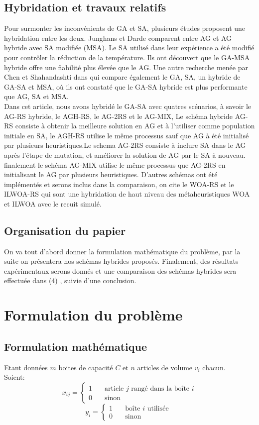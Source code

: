 \documentclass[preprint]{elsarticle}
\begin{document}
\subsection{Hybridation et travaux relatifs}
Pour surmonter les inconvénients  de GA et SA, plusieurs études proposent une hybridation entre les deux.
Junghans et Darde \cite{Junghans} comparent entre AG et AG hybride avec SA modifiée (MSA).
 Le SA utilisé dans leur expérience a été modifié pour contrôler la réduction de la température.
 Ils ont découvert que le GA-MSA hybride offre une fiabilité plus élevée que le AG.
 Une autre recherche menée par Chen et Shahandashti dans \cite{Chen} qui compare également le GA, SA, un hybride de GA-SA et MSA, où ils ont constaté que le GA-SA hybride est plus performante que AG, SA et MSA. \\
Dans cet article, nous avons hybridé le GA-SA avec quatres scénarios, à savoir le AG-RS hybride, le AGH-RS, le AG-2RS et le AG-MIX, Le schéma hybride AG-RS consiste à obtenir la meilleure solution en AG et à l'utiliser comme population initiale en SA,
le AGH-RS utilise le même processus sauf que AG à été initialisé par plusieurs heuristiques.Le schema AG-2RS  consiste à inclure SA dans le AG après l’étape de mutation, et améliorer la solution de AG par le SA à nouveau. finalement le schéma AG-MIX utilise le même processus que AG-2RS en initialisant le AG par plusieurs heuristiques. 
D’autres schémas ont été implémentés et serons inclus dans la comparaison, on cite le WOA-RS  et le ILWOA-RS qui sont une hybridation de haut niveau des métaheuristiques WOA\cite{WOA} et ILWOA\cite{ILWOA} avec le recuit simulé.

 
 \subsection{Organisation du papier}
 On va tout d’abord donner la formulation mathématique du problème, par la suite on présentera nos schémas hybrides proposés. Finalement, des résultats expérimentaux serons donnés et une comparaison des schémas hybrides sera effectuée  dans (4) , suivie d’une conclusion.

\section{Formulation du problème}
\subsection{Formulation mathématique}
Etant données \(m\) boites de capacité \(C\) et \(n\) articles de volume \(v_i\) chacun. \\
    Soient: 
    \[ x_{ij} =
        \begin{cases}
            1  & \quad \text{article } j \text{ rangé dans la boîte } i \\
            0  & \quad \text{sinon } 
        \end{cases}
    \]
    \[ y_i =
    \begin{cases}
        1  & \quad \text{boîte } i \text{ utilisée } \\
        0  & \quad \text{sinon } 
    \end{cases}
    \]
\end{document}
